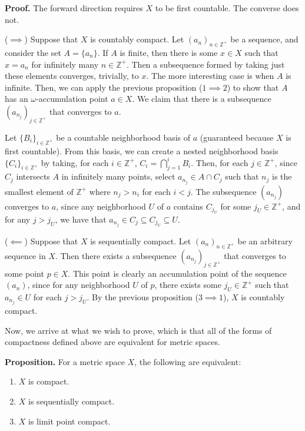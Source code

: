 \documentclass[12pt]{article}
\begin{document}
\textbf{Proof. } The forward direction requires $X$ to be first countable. The converse does not.

($\implies$) Suppose that $X$ is countably compact. Let $(a_n)_{n \in \mathbb{Z}^+}$ be a sequence, and consider the set $A = \{ a_n \}$. If $A$ is finite, then there is some $x \in X$ such that $x = a_n$ for infinitely many $n \in \mathbb{Z}^+$. Then a subsequence formed by taking just these elements converges, trivially, to $x$. The more interesting case is when $A$ is infinite. Then, we can apply the previous proposition ($1 \implies 2$) to show that $A$ has an $\omega$-accumulation point $a \in X$. We claim that there is a subsequence $(a_{n_j})_{j \in \mathbb{Z}^+}$ that converges to $a$.

Let $\{ B_i \}_{i \in \mathbb{Z}^+}$ be a countable neighborhood basis of $a$ (guaranteed because $X$ is first countable). From this basis, we can create a nested neighborhood basis $\{ C_i \}_{i \in \mathbb{Z}^+}$ by taking, for each $i \in \mathbb{Z}^+$, $C_i = \bigcap_{j = 1}^i B_i$. Then, for each $j \in \mathbb{Z}^+$, since $C_j$ intersects $A$ in infinitely many points, select $a_{n_j} \in A \cap C_j$ such that $n_j$ is the smallest element of $\mathbb{Z}^+$ where $n_j > n_i$ for each $i < j$. The subsequence $(a_{n_j})$ converges to $a$, since any neighborhood $U$ of $a$ contains $C_{j_U}$ for some $j_U \in \mathbb{Z}^+$, and for any $j > j_U$, we have that $a_{n_j} \in C_j \subseteq C_{j_U} \subseteq U$.

($\impliedby$) Suppose that $X$ is sequentially compact. Let $(a_n)_{n \in \mathbb{Z}^+}$ be an arbitrary sequence in $X$. Then there exists a subsequence $(a_{n_j})_{j \in \mathbb{Z}^+}$ that converges to some point $p \in X$. This point is clearly an accumulation point of the sequence $(a_n)$, since for any neighborhood $U$ of $p$, there exists some $j_U \in \mathbb{Z}^+$ such that $a_{n_j} \in U$ for each $j > j_U$. By the previous proposition ($3 \implies 1$), $X$ is countably compact.


\vspace{2 \baselineskip}


Now, we arrive at what we wish to prove, which is that all of the forms of compactness defined above are equivalent for metric spaces.

\textbf{Proposition. } For a metric space $X$, the following are equivalent:

\begin{enumerate}
\item $X$ is compact.
\item $X$ is sequentially compact.
\item $X$ is limit point compact.
\end{enumerate}
\end{document}
